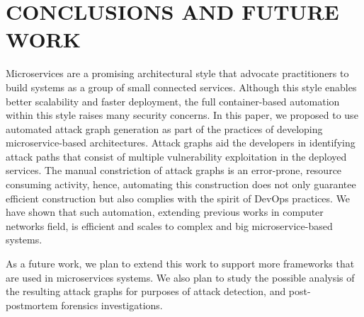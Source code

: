 \section{CONCLUSIONS AND FUTURE WORK}
\label{chap:conclusion}

Microservices are a promising architectural style that advocate practitioners to build systems as a group of small connected  services. Although this style enables better scalability and faster deployment, the full container-based automation within this style raises many security concerns. In this paper, we proposed to use automated attack graph generation as part of the practices of developing microservice-based architectures. Attack graphs aid the developers in identifying attack paths that consist of multiple vulnerability exploitation in the deployed services. The manual constriction of attack graphs is an error-prone, resource consuming activity, hence, automating this construction does not only guarantee efficient construction but also complies with the spirit of DevOps practices. We have shown that such automation, extending previous works in computer networks field, is efficient and scales to complex and big microservice-based systems. 

As a future work, we plan to extend this work to support more frameworks that are used in microservices systems. We also plan to study the possible analysis of the resulting attack graphs for purposes of attack detection, and post-postmortem forensics investigations. 
